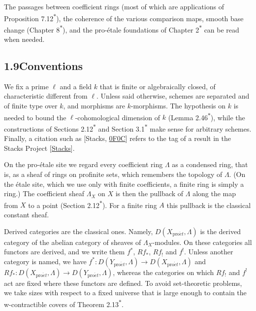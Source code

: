 \documentclass[11pt]{article}
\newcommand{\bpout}[1]{#1\textsuperscript{\hyperlink{bp-outside}{\ensuremath{\ast}}}}
\begin{document}
The passages between coefficient rings (most of which are applications of Proposition \bpout{7.12}), the coherence of the various comparison maps, smooth base change (Chapter \bpout{8}), and the pro-étale foundations of Chapter \bpout{2} can be read when needed.


\subsection*{\texorpdfstring{1.9\quad Conventions}{1.9 Conventions}}
\label{bp19}%
\label{bp20}%
We fix a prime \(\ell\) and a field \(k\) that is finite or algebraically closed, of characteristic different from \(\ell\). Unless said otherwise, schemes are separated and of finite type over \(k\), and morphisms are \(k\)-morphisms. The hypothesis on \(k\) is needed to bound the \(\ell\)-cohomological dimension of \(k\) (Lemma \bpout{2.46}), while the constructions of Sections \bpout{2.12} and \bpout{Section 3.1} make sense for arbitrary schemes. Finally, a citation such as [Stacks, \href{https://stacks.math.columbia.edu/tag/0F0C}{0F0C}] refers to the tag of a result in the Stacks Project [\hyperref[bp37]{Stacks}].

On the pro-étale site we regard every coefficient ring \(\Lambda\) as a condensed ring, that is, as a sheaf of rings on profinite sets, which remembers the topology of \(\Lambda\). (On the étale site, which we use only with finite coefficients, a finite ring is simply a ring.) The coefficient sheaf \(\Lambda_X\) on \(X\) is then the pullback of \(\Lambda\) along the map from \(X\) to a point (Section \bpout{2.12}). For a finite ring \(A\) this pullback is the classical constant sheaf.

Derived categories are the classical ones. Namely, \(D(X_{\mathrm{pro}\acute{e}t},\Lambda)\) is the derived category of the abelian category of sheaves of \(\Lambda_X\)-modules. On these categories all functors are derived, and we write them \(f^*\), \(Rf_*\), \(Rf_!\) and \(f^!\). Unless another category is named, we have \(f^*:D(Y_{\mathrm{pro}\acute{e}t},\Lambda)\to D(X_{\mathrm{pro}\acute{e}t},\Lambda)\) and \(Rf_*:D(X_{\mathrm{pro}\acute{e}t},\Lambda)\to D(Y_{\mathrm{pro}\acute{e}t},\Lambda)\), whereas the categories on which \(Rf_!\) and \(f^!\) act are fixed where these functors are defined. To avoid set-theoretic problems, we take sizes with respect to a fixed universe that is large enough to contain the w-contractible covers of Theorem \bpout{2.13}.
\end{document}
